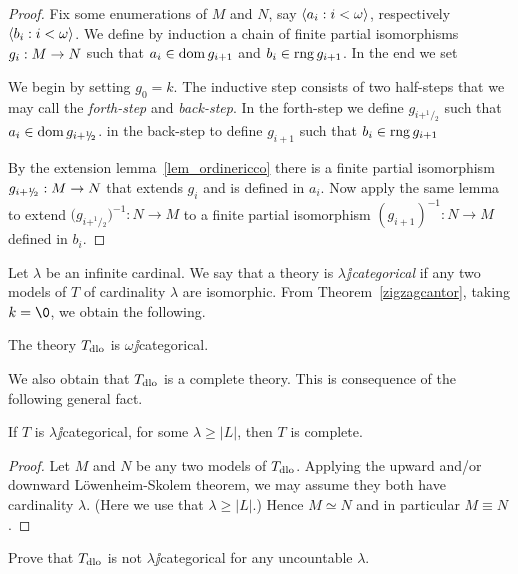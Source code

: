 \documentclass[creche.tex]{subfiles}
\begin{document}
\begin{proof}
Fix some enumerations of $M$ and $N$, say $\langle a_i:i<\omega\rangle$, respectively $\langle b_i:i<\omega\rangle$.  We define by induction a chain of finite partial isomorphisms $g_i:M\rightarrow N$ such that $a_i\in\mathop{\rm dom} g_{i+1}$ and $b_i\in\mathop{\rm rng} g_{i+1}$. In the end we set


We begin by setting $g_0=k$. The inductive step consists of two half-steps that we may call the \textit{forth-step} and \textit{back-step}. In the forth-step we define $g_{i+^1\!\!/\!_2}$ such that $a_i\in\mathop{\rm dom} g_{i+^1\!\!/\!_2}$. in the back-step to define $g_{i+1}$ such that $b_i\in\mathop{\rm rng} g_{i+1}$

By the extension lemma~\ref{lem_ordinericco} there is a finite partial isomorphism $g_{i+^1\!\!/\!_2}:M\rightarrow N$ that extends $g_i$ and is defined in $a_i$. Now apply the same lemma to extend $\big(g_{i+^1\!\!/\!_2}\big)^{-1}:N\to M$ to a finite partial isomorphism $(g_{i+1})^{-1}:N\to M$ defined in $b_i$.
\end{proof}

Let $\lambda$ be an infinite cardinal. We say that a theory is \emph{$\lambda\jj$categorical\/} if any two models of $T$ of cardinality $\lambda$ are isomorphic. From Theorem~\ref{zigzagcantor}, taking $k=\0$, we obtain the following.

\begin{corollary}
The theory $T_{\rm dlo}$ is $\omega\jj$categorical.\QED
\end{corollary}

We also obtain that $T_{\rm dlo}$ is a complete theory. This is consequence of the following general fact.

\begin{proposition}\label{thm_categorical->complete}
If $T$ is $\lambda\jj$categorical, for some $\lambda\ge|L|$, then $T$ is complete.
\end{proposition}

\begin{proof}
Let $M$ and $N$ be any two models of $T_{\rm dlo}$. Applying the upward and/or downward L\"owenheim-Skolem theorem, we may assume they both have cardinality $\lambda$. (Here we use that $\lambda\ge|L|$.) Hence $M\simeq N$ and in particular $M\equiv N$.
\end{proof}

\begin{exercise}
Prove that $T_{\rm dlo}$ is not $\lambda\jj$categorical for any uncountable $\lambda$.\QED
\end{exercise}
\end{document}
